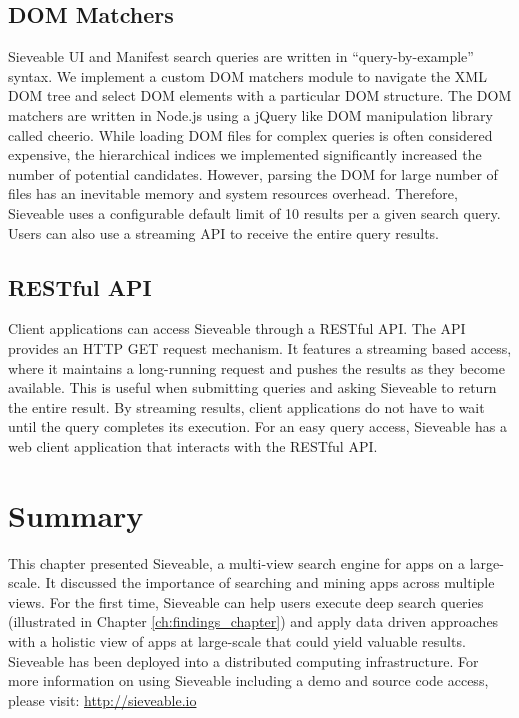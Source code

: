 \subsection{DOM Matchers}

Sieveable UI and Manifest search queries are written in ``query-by-example'' syntax.
We implement a custom DOM matchers module to navigate the XML DOM tree and select DOM elements with a particular DOM structure.
The DOM matchers are written in Node.js using a jQuery like DOM manipulation library called cheerio.
While loading DOM files for complex queries is often considered expensive, the hierarchical indices we implemented significantly increased the number of potential candidates. 
However, parsing the DOM for large number of files has an inevitable memory and system resources overhead.
Therefore, Sieveable uses a configurable default limit of 10 results per a given search query.
Users can also use a streaming API to receive the entire query results.

\subsection{RESTful API}
Client applications can access Sieveable through a RESTful API. The API provides an HTTP GET request mechanism. It features a streaming based access, where it maintains a long-running request and pushes the results as they become available.
This is useful when submitting queries and asking Sieveable to return the entire result.
By streaming results, client applications do not have to wait until the query completes its execution. 
For an easy query access, Sieveable has a web client application that interacts with the RESTful API.


\section{Summary}
This chapter presented Sieveable, a multi-view search engine for apps on a large-scale.
It discussed the importance of searching and mining apps across multiple views.
For the first time, Sieveable can help users execute deep search queries (illustrated in Chapter \ref{ch:findings_chapter}) and apply data driven approaches with a holistic view of apps at large-scale that could yield valuable results.
Sieveable has been deployed into a distributed computing infrastructure.
For more information on using Sieveable including a demo and source code access, please visit:
\url{http://sieveable.io}
